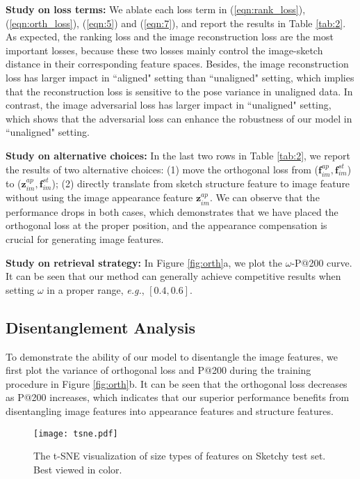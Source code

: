 \documentclass[10pt,twocolumn,letterpaper]{article}
\begin{document}
\noindent\textbf{Study on loss terms: }
We ablate each loss term in (\ref{eqn:rank_loss}), (\ref{eqn:orth_loss}), (\ref{eqn:5}) and (\ref{eqn:7}), and report the results in Table \ref{tab:2}. As expected, the ranking loss and the image reconstruction loss are the most important losses, because these two losses mainly control the image-sketch distance in their corresponding feature spaces. Besides, the image reconstruction loss has larger impact in ``aligned" setting than ``unaligned" setting, which implies that the reconstruction loss is sensitive to the pose variance in unaligned data. In contrast, the image adversarial loss has larger impact in ``unaligned" setting, which shows that the adversarial loss can enhance the robustness of our model in ``unaligned" setting.

\noindent\textbf{Study on alternative choices: }
In the last two rows in Table \ref{tab:2}, we report the results of two alternative choices: (1) move the orthogonal loss from ($\mathbf{f}_{im}^{ap}, \mathbf{f}_{im}^{st}$) to ($\mathbf{z}_{im}^{ap},\mathbf{f}_{im}^{st}$); (2) directly translate from sketch structure feature to image feature without using the image appearance feature $\mathbf{z}_{im}^{ap}$. We can observe that the performance drops in both cases, which demonstrates that we have placed the orthogonal loss at the proper position, and the appearance compensation is crucial for generating image features.

\noindent\textbf{Study on retrieval strategy: }
In Figure \ref{fig:orth}\color{red}a\color{black}, we plot the $\omega$-P@200 curve. It can be seen that our method can generally achieve competitive results when setting $\omega$ in a proper range, \emph{e.g.}, $[0.4, 0.6]$. 

\subsection{Disentanglement Analysis}
To demonstrate the ability of our model to disentangle the image features, we first plot the variance of orthogonal loss and P@200 during the training procedure in Figure \ref{fig:orth}\color{red}b\color{black}. It can be seen that the orthogonal loss decreases as P@200 increases, which indicates that our superior performance benefits from disentangling image features into appearance features and structure features.

\begin{figure}
\begin{center}
\texttt{[image: tsne.pdf]}
\end{center}
\vspace{-10pt}
   \caption{The t-SNE visualization of size types of features on Sketchy test set. Best viewed in color.}
\label{fig:tsne}
\vspace{-15pt}
\end{figure}
\end{document}
